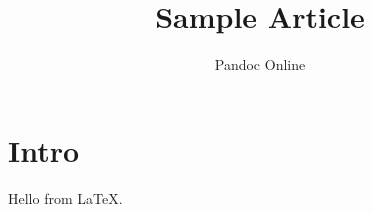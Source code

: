 \documentclass{article}
\begin{document}
\title{Sample Article}
\author{Pandoc Online}
\maketitle
\section{Intro}
Hello from \LaTeX.
\end{document}
